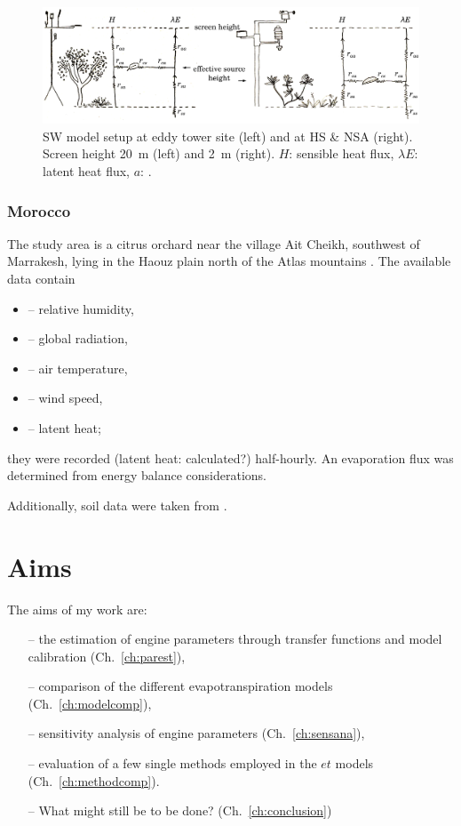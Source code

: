 \documentclass{scrreprt}
\newenvironment{denseitem}{
  \begin{itemize}
    \setlength{\itemsep}{0pt}
    \setlength{\parskip}{0pt}
    \setlength{\parsep}{0pt}
}{
  \end{itemize}
}
\begin{document}
\begin{figure}[t]
  \centering
  \includegraphics[width=1.0\hsize]{./fig/sw_scheme}
  \caption{SW model setup at eddy tower site (left) and at HS \& NSA (right).
           Screen height 20~m (left) and 2~m (right).
           $H$: sensible heat flux, $\lambda E$: latent heat flux, $a$: .}
  \label{fig:sw_scheme}
\end{figure}

\newpage
\subsection{Morocco} \label{ssec:intro_areas_morocco}

The study area is a citrus orchard near the village Ait Cheikh, southwest of Marrakesh, lying in the Haouz plain north of the Atlas mountains \citep{mroos14}.
The available data contain
\begin{denseitem}
  \item[--] relative humidity,
  \item[--] global radiation,
  \item[--] air temperature,
  \item[--] wind speed,
  \item[--] latent heat;
\end{denseitem}
%
they were recorded (latent heat: calculated?) half-hourly.
An evaporation flux was determined from energy balance considerations.

Additionally, soil data were taken from \citet{mroos14}.


\chapter{Aims} \label{ch:aims}

The aims of my work are:
\begin{itemize}
  \item[--] the estimation of engine parameters through transfer functions and model calibration (Ch.~\ref{ch:parest}),
  \item[--] comparison of the different evapotranspiration models (Ch.~\ref{ch:modelcomp}),
  \item[--] sensitivity analysis of engine parameters (Ch.~\ref{ch:sensana}),
  \item[--] evaluation of a few single methods employed in the $et$ models (Ch.~\ref{ch:methodcomp}).
  \item[--] What might still be to be done? (Ch.~\ref{ch:conclusion})
\end{itemize}
\end{document}
